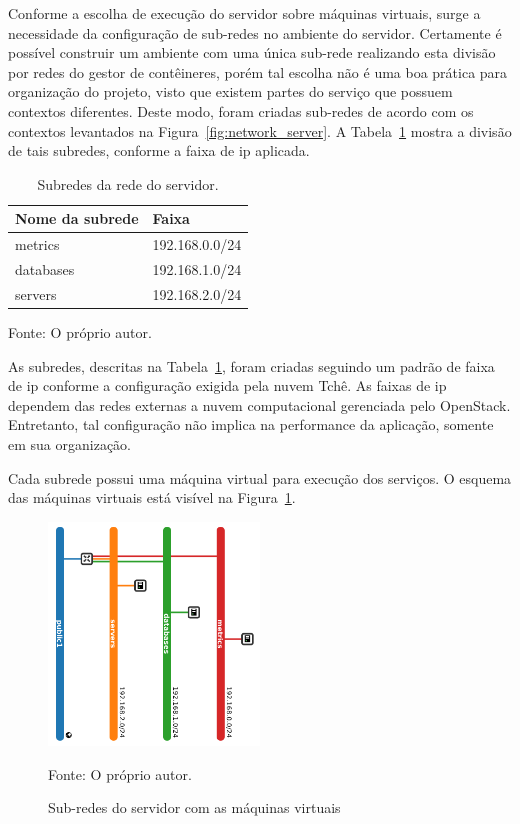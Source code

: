 Conforme a escolha de execução do servidor sobre máquinas virtuais, surge a necessidade da configuração de sub-redes no ambiente do servidor.
%
Certamente é possível construir um ambiente com uma única sub-rede realizando esta divisão por redes do gestor de contêineres, porém tal escolha não é uma boa prática para organização do projeto, visto que existem partes do serviço que possuem contextos diferentes.
%
Deste modo, foram criadas sub-redes de acordo com os contextos levantados na Figura~\ref{fig:network_server}.
%
A Tabela~\ref{tab:subredes} mostra a divisão de tais subredes, conforme a faixa de \ac{ip} aplicada.



\begin{table}[htb!]
\centering
\begin{adjustbox}{max width=\textwidth}
\caption{Subredes da rede do servidor.}
\label{tab:subredes}
\begin{tabular}{|l|l|}
\hline
Nome da subrede & Faixa          \\ \hline
metrics         & 192.168.0.0/24 \\ \hline
databases       & 192.168.1.0/24 \\ \hline
servers         & 192.168.2.0/24 \\ \hline
\end{tabular}
\end{adjustbox}

Fonte: O próprio autor.
\end{table}



As subredes, descritas na Tabela~\ref{tab:subredes}, foram criadas seguindo um padrão de faixa de \ac{ip} conforme a configuração exigida pela nuvem Tchê.
%
As faixas de \ac{ip} dependem das redes externas a nuvem computacional gerenciada pelo OpenStack.
%
Entretanto, tal configuração não implica na performance da aplicação, somente em sua organização.

Cada subrede possui uma máquina virtual para execução dos serviços.
%
O esquema das máquinas virtuais está visível na Figura~\ref{fig:virtual_machines}.




\begin{figure}[htb!]
  \caption{Sub-redes do servidor com as máquinas virtuais}
  \label{fig:virtual_machines}
  \includegraphics[width=0.5\textwidth]{figuras/network/bars.png}
  \centering

  Fonte: O próprio autor.
\end{figure}




